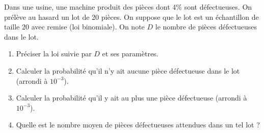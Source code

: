 \documentclass[11pt]{article}
\begin{document}
\begin{exercice}
Dans une usine, une machine produit des pièces dont 4\% sont défectueuses. On prélève au hasard un lot de 20 pièces. On suppose que le lot est un échantillon de taille 20 avec remise (loi binomiale). On note $D$ le nombre de pièces défectueuses dans le lot.
\begin{enumerate}
    \item Préciser la loi suivie par $D$ et ses paramètres.
    \item Calculer la probabilité qu'il n'y ait aucune pièce défectueuse dans le lot (arrondi à $10^{-3}$).
    \item Calculer la probabilité qu'il y ait au plus une pièce défectueuse (arrondi à $10^{-3}$).
    \item Quelle est le nombre moyen de pièces défectueuses attendues dans un tel lot ?
\end{enumerate}
\end{exercice}
\end{document}
